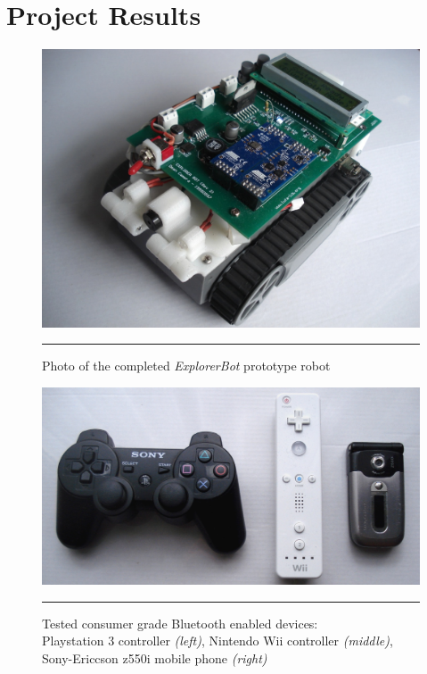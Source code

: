 \chapter{Project Results}
\label{Chapter 6}


\begin{figure}[tbph]
	\vspace{1em}
	\centering
		\includegraphics[width=140mm]{./Figures/CompletedRobot.jpg}
	\rule{35em}{0.5pt}
	\caption[Photo of Completed Robot]{Photo of the completed \textit{ExplorerBot} prototype robot}
	\label{fig:completedrobot}
\end{figure}

\begin{figure}[tbph]
	\vspace{1em}
	\centering
		\includegraphics[width=140mm]{./Figures/BluetoothControllers.jpg}
	\rule{35em}{0.5pt}
	\caption[Tested Working Controllers]{Tested consumer grade Bluetooth enabled devices: \\ Playstation 3 controller \textit{(left)}, Nintendo Wii controller \textit{(middle)}, Sony-Ericcson z550i mobile phone \textit{(right)} }
	\label{fig:completedrobot}
\end{figure}